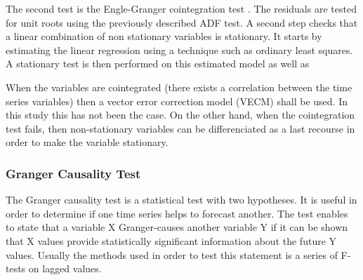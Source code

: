 The second test is the Engle-Granger cointegration test \citep{engle1987co}. The residuals are tested for unit roots using the previously described ADF test. A second step checks that a linear combination of non stationary variables is stationary. It starts by estimating the linear regression using a technique such as ordinary least squares. A stationary test is then performed on this estimated model as well as 

When the variables are cointegrated (there exists a correlation between the time series variables) then a vector error correction model (VECM) shall be used. In this study this has not been the case. On the other hand, when the cointegration test fails, then non-stationary variables can be differenciated as a last recourse in order to make the variable stationary.

\subsubsection{Granger Causality Test}

The Granger causality test is a statistical test with two hypotheses. It is useful in order to determine if one time series helps to forecast another. The test enables to state that a variable X Granger-causes another variable Y if it can be shown that X values provide statistically significant information about the future Y values. Usually the methods used in order to test this statement is a series of F-tests on lagged values.
